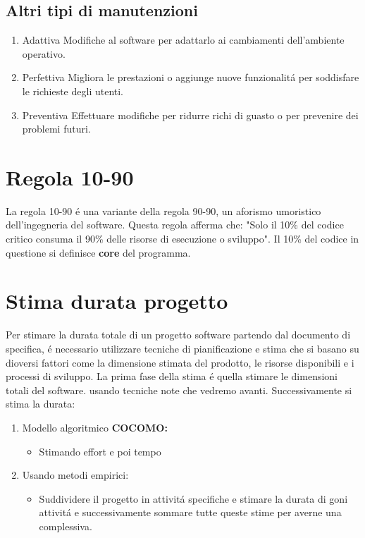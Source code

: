 \documentclass[11pt]{article}
\begin{document}
\subsection{Altri tipi di manutenzioni}
\label{sec:orgbba7e39}
\begin{enumerate}
\item Adattiva
\label{sec:orgd6264ea}
Modifiche al software per adattarlo ai cambiamenti dell'ambiente operativo.
\item Perfettiva
\label{sec:org25cb326}
Migliora le prestazioni o aggiunge nuove funzionalitá per soddisfare le richieste degli utenti.
\item Preventiva
\label{sec:orgb63b2ea}
Effettuare modifiche per ridurre richi di guasto o per prevenire dei problemi futuri.
\end{enumerate}
\section{Regola 10-90}
\label{sec:orgfbe2693}
La regola 10-90 é una variante della regola 90-90, un aforismo umoristico dell'ingegneria del software.
Questa regola afferma che: "Solo il 10\% del codice critico consuma il 90\% delle risorse di esecuzione o sviluppo".
Il 10\% del codice in questione si definisce \textbf{\textbf{core}} del programma.
\section{Stima durata progetto}
\label{sec:org6c178c1}
Per stimare la durata totale di un progetto software partendo dal documento di specifica, é necessario utilizzare tecniche di pianificazione e stima che si basano su dioversi fattori come la dimensione stimata del prodotto, le risorse disponibili e i processi di sviluppo.
La prima fase della stima é quella stimare le dimensioni totali del software. usando tecniche note che vedremo avanti.
Successivamente si stima la durata:
\begin{enumerate}
\item Modello algoritmico \textbf{\textbf{COCOMO:}}
\begin{itemize}
\item Stimando effort e poi tempo
\end{itemize}
\item Usando metodi empirici:
\begin{itemize}
\item Suddividere il progetto in attivitá specifiche e stimare la durata di goni attivitá e successivamente sommare tutte queste stime per averne una complessiva.
\end{itemize}
\end{enumerate}
\end{document}
